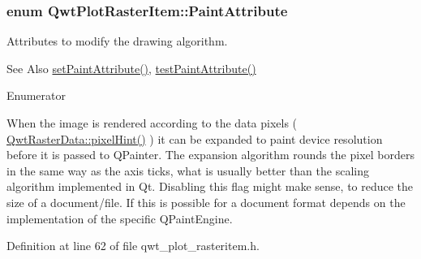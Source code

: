 \hypertarget{class_qwt_plot_raster_item_a75ac68ea258b8612e8a1893e845394ee}{
\subsubsection[{Paint\-Attribute}]{\setlength{\rightskip}{0pt plus 5cm}enum {\bf Qwt\-Plot\-Raster\-Item\-::\-Paint\-Attribute}}}\label{class_qwt_plot_raster_item_a75ac68ea258b8612e8a1893e845394ee}
Attributes to modify the drawing algorithm. \begin{DoxySeeAlso}{See Also}
\hyperlink{class_qwt_plot_raster_item_a70d6b94821e5eafb29b1f045d1f3a2e6}{set\-Paint\-Attribute()}, \hyperlink{class_qwt_plot_raster_item_a17d8f350acf46d2ba7a68df977f80a52}{test\-Paint\-Attribute()} 
\end{DoxySeeAlso}
\begin{Desc}
\item[Enumerator]\par
\begin{description}
\item[{\em 
\hypertarget{class_qwt_plot_raster_item_a75ac68ea258b8612e8a1893e845394eea77b139d4d7327465408fe06ec98dbc0d}{Paint\-In\-Device\-Resolution}\label{class_qwt_plot_raster_item_a75ac68ea258b8612e8a1893e845394eea77b139d4d7327465408fe06ec98dbc0d}
}]When the image is rendered according to the data pixels ( \hyperlink{class_qwt_raster_data_ad1ce58351804760d1ba1e7efe97d39d6}{Qwt\-Raster\-Data\-::pixel\-Hint()} ) it can be expanded to paint device resolution before it is passed to Q\-Painter. The expansion algorithm rounds the pixel borders in the same way as the axis ticks, what is usually better than the scaling algorithm implemented in Qt. Disabling this flag might make sense, to reduce the size of a document/file. If this is possible for a document format depends on the implementation of the specific Q\-Paint\-Engine. \end{description}
\end{Desc}


Definition at line 62 of file qwt\-\_\-plot\-\_\-rasteritem.\-h.



